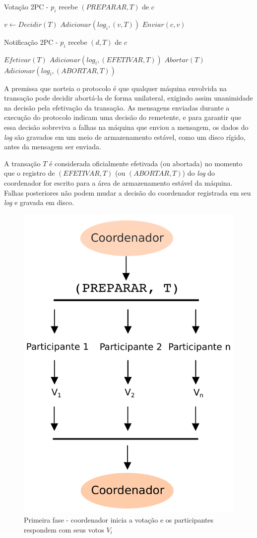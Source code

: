 \documentclass[11pt,twoside,a4paper]{book}
\begin{document}
\begin{algorithm}
\caption{Votação 2PC - $p_i$ recebe $(PREPARAR, T)$ de $c$}
\label{alg:2pc_participante1}
\begin{algorithmic}[1]
\State $v \gets Decidir(T)$
\State $Adicionar(log_i, (v, T))$
\State $Enviar(c, v)$
\end{algorithmic}
\end{algorithm}

\begin{algorithm}
\caption{Notificação 2PC - $p_i$ recebe $(d, T)$ de $c$}
\label{alg:2pc_participante2}
\begin{algorithmic}[1]
	\State $Efetivar(T)$
	\State $Adicionar(log_i, (EFETIVAR, T))$
\Else
	\State $Abortar(T)$
	\State $Adicionar(log_i, (ABORTAR, T))$
\EndIf
\end{algorithmic}
\end{algorithm}

A premissa que norteia o protocolo é que qualquer máquina envolvida na transação pode decidir abortá-la de forma unilateral, exigindo assim unanimidade na decisão pela efetivação da transação. As mensagens enviadas durante a execução do protocolo indicam uma decisão do remetente, e para garantir que essa decisão sobreviva a falhas na máquina que enviou a mensagem, os dados do \emph{log} são gravados em um meio de armazenamento estável, como um disco rígido, antes da mensagem ser enviada.

A transação $T$ é considerada oficialmente efetivada (ou abortada) no momento que o registro de $(EFETIVAR, T)$ (ou $(ABORTAR, T)$) do \emph{log} do coordenador for escrito para a área de armazenamento estável da máquina. Falhas posteriores não podem mudar a decisão do coordenador registrada em seu \emph{log} e gravada em disco.

\begin{figure}
  \centering
  \includegraphics[width=.40\textwidth]{2PC_1fase} 
  \caption{Primeira fase - coordenador inicia a votação e os participantes respondem com seus votos $V_i$}
  \label{fig:2PC_1fase} 
\end{figure}
\end{document}
